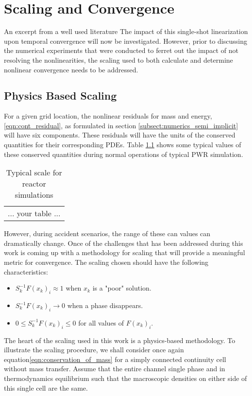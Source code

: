 \chapter{Scaling and Convergence}
\label{chap:scaling_and_convergence}
An excerpt from a well used literature
The impact of this single-shot linearization upon temporal convergence will now be investigated.
However, prior to discussing the numerical experiments that were conducted to ferret out the impact of not resolving the nonlinearities, the scaling used to both calculate and determine nonlinear convergence needs to be addressed.

\section{Physics Based Scaling}
\label{sect:scaling}
For a given grid location, the nonlinear residuals for mass and energy, \eqref{eqn:cont_residual}, as formulated in section \ref{subsect:numerics_semi_implicit} will have six components.
These residuals will have the units of the conserved quantities for their corresponding PDEs.
Table \ref{tab:scaling_units_scales} shows some typical values of these conserved quantities during normal operations of typical PWR simulation.

\begin{table}[ht]
\centering
\begin{tabular}{|l|}
... your table ...
\end{tabular}
\caption{Typical scale for reactor simulations}
\label{tab:scaling_units_scales}
\end{table}

However, during accident scenarios, the range of these can values can dramatically change.
Once of the challenges that has been addressed during this work is coming up with a methodology for scaling that will provide a meaningful metric for convergence.
The scaling chosen should have the following characteristics:
\begin{itemize}
\item{$S^{-1}_k F(x_k)_i \approx 1$ when $x_k$ is a "poor" solution.}
\item{$S^{-1}_k F(x_k)_i \rightarrow 0$ when a phase disappears.}
\item{$0 \leq S^{-1}_k F(x_k)_i \leq 0 $ for all values of $F(x_k)_i$.}
\end{itemize}

The heart of the scaling used in this work is a physics-based methodology.
To illustrate the scaling procedure, we shall consider once again equation\ref{eqn:conservation_of_mass} for a simply connected continuity cell without mass transfer.
Assume that the entire channel single phase and in thermodynamics equilibrium such that the macroscopic densities on either side of this single cell are the same.

